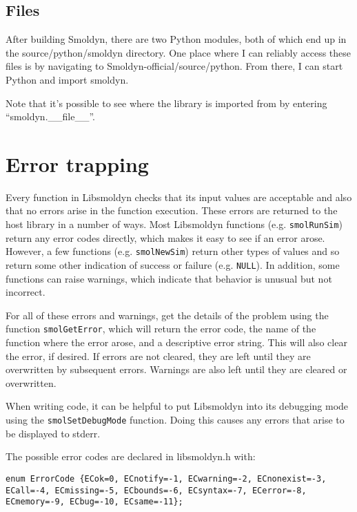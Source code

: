 \documentclass {book}
\begin{document}
\section{Files}

After building Smoldyn, there are two Python modules, both of which end up in the source/python/smoldyn directory. One place where I can reliably access these files is by navigating to Smoldyn-official/source/python. From there, I can start Python and import smoldyn.

Note that it's possible to see where the library is imported from by entering ``smoldyn.\_\_file\_\_''.

\chapter{Error trapping}

Every function in Libsmoldyn checks that its input values are acceptable and also that no errors arise in the function execution. These errors are returned to the host library in a number of ways. Most Libsmoldyn functions (e.g. \texttt{smolRunSim}) return any error codes directly, which makes it easy to see if an error arose. However, a few functions (e.g. \texttt{smolNewSim}) return other types of values and so return some other indication of success or failure (e.g. \texttt{NULL}). In addition, some functions can raise warnings, which indicate that behavior is unusual but not incorrect.

For all of these errors and warnings, get the details of the problem using the function \texttt{smolGetError}, which will return the error code, the name of the function where the error arose, and a descriptive error string. This will also clear the error, if desired. If errors are not cleared, they are left until they are overwritten by subsequent errors. Warnings are also left until they are cleared or overwritten.

When writing code, it can be helpful to put Libsmoldyn into its debugging mode using the \texttt{smolSetDebugMode} function. Doing this causes any errors that arise to be displayed to stderr.

The possible error codes are declared in libsmoldyn.h with:

\begin{lstlisting}
enum ErrorCode {ECok=0, ECnotify=-1, ECwarning=-2, ECnonexist=-3, ECall=-4, ECmissing=-5, ECbounds=-6, ECsyntax=-7, ECerror=-8, ECmemory=-9, ECbug=-10, ECsame=-11};
\end{lstlisting}
\end{document}
